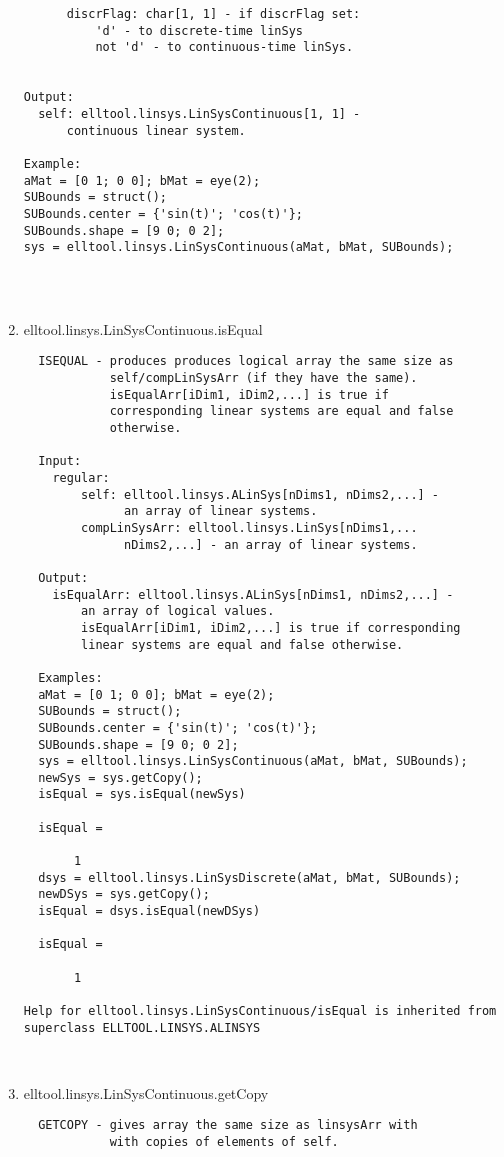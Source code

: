\begin{enumerate}
\begin{lstlisting}
      discrFlag: char[1, 1] - if discrFlag set:
          'd' - to discrete-time linSys
          not 'd' - to continuous-time linSys.


Output:
  self: elltool.linsys.LinSysContinuous[1, 1] -
      continuous linear system.

Example:
aMat = [0 1; 0 0]; bMat = eye(2);
SUBounds = struct();
SUBounds.center = {'sin(t)'; 'cos(t)'};
SUBounds.shape = [9 0; 0 2];
sys = elltool.linsys.LinSysContinuous(aMat, bMat, SUBounds);




\end{lstlisting}
\fontfamily{\familydefault}
\selectfont
\item {elltool.linsys.LinSysContinuous.isEqual}
\selectfont
\begin{lstlisting}
  ISEQUAL - produces produces logical array the same size as
            self/compLinSysArr (if they have the same).
            isEqualArr[iDim1, iDim2,...] is true if
            corresponding linear systems are equal and false
            otherwise.

  Input:
    regular:
        self: elltool.linsys.ALinSys[nDims1, nDims2,...] -
              an array of linear systems.
        compLinSysArr: elltool.linsys.LinSys[nDims1,...
              nDims2,...] - an array of linear systems.

  Output:
    isEqualArr: elltool.linsys.ALinSys[nDims1, nDims2,...] -
        an array of logical values.
        isEqualArr[iDim1, iDim2,...] is true if corresponding
        linear systems are equal and false otherwise.

  Examples:
  aMat = [0 1; 0 0]; bMat = eye(2);
  SUBounds = struct();
  SUBounds.center = {'sin(t)'; 'cos(t)'};
  SUBounds.shape = [9 0; 0 2];
  sys = elltool.linsys.LinSysContinuous(aMat, bMat, SUBounds);
  newSys = sys.getCopy();
  isEqual = sys.isEqual(newSys)

  isEqual =

       1
  dsys = elltool.linsys.LinSysDiscrete(aMat, bMat, SUBounds);
  newDSys = sys.getCopy();
  isEqual = dsys.isEqual(newDSys)

  isEqual =

       1

Help for elltool.linsys.LinSysContinuous/isEqual is inherited from superclass ELLTOOL.LINSYS.ALINSYS



\end{lstlisting}
\fontfamily{\familydefault}
\selectfont
\item {elltool.linsys.LinSysContinuous.getCopy}
\selectfont
\begin{lstlisting}
  GETCOPY - gives array the same size as linsysArr with
            with copies of elements of self.


\end{lstlisting}
\end{enumerate}
